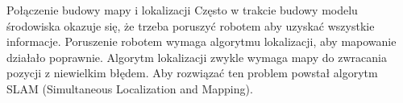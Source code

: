 \begin{frame}
{Połączenie budowy mapy i lokalizacji}
	Często w trakcie budowy modelu środowiska okazuje się, że trzeba poruszyć robotem aby uzyskać wszystkie informacje.
	Poruszenie robotem wymaga algorytmu lokalizacji, aby mapowanie działało poprawnie.
	Algorytm lokalizacji zwykle wymaga mapy do zwracania pozycji z niewielkim błędem.
	Aby rozwiązać ten problem powstał algorytm SLAM (Simultaneous Localization and Mapping).
\end{frame}